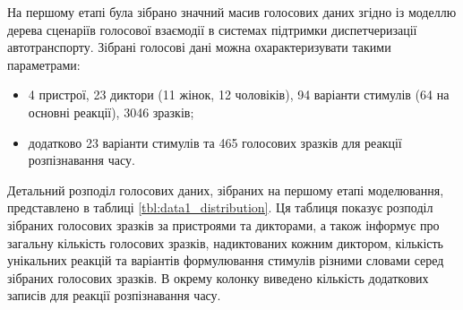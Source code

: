 На першому етапі була зібрано значний масив голосових даних згідно із моделлю дерева сценаріїв голосової взаємодії в системах підтримки диспетчеризації автотранспорту. Зібрані голосові дані можна охарактеризувати такими параметрами:

\begin{itemize}
	\item 4 пристрої, 23 диктори (11 жінок, 12 чоловіків), 94 варіанти стимулів (64 на основні реакції), 3046 зразків;
	\item додатково 23 варіанти стимулів та 465 голосових зразків для реакції розпізнавання часу.
\end{itemize}

Детальний розподіл голосових даних, зібраних на першому етапі моделювання, представлено в таблиці \ref{tbl:data1_distribution}. Ця таблиця показує розподіл зібраних голосових зразків за пристроями та дикторами, а також інформує про загальну кількість голосових зразків, надиктованих кожним диктором, кількість унікальних реакцій та варіантів формулювання стимулів різними словами серед зібраних голосових зразків. В окрему колонку виведено кількість додаткових записів для реакції розпізнавання часу.


